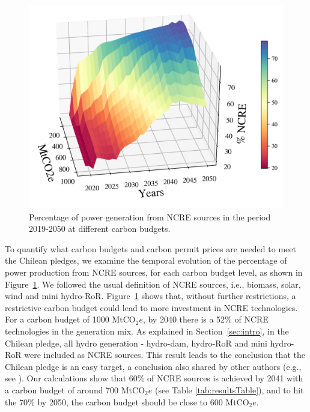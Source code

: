 \documentclass[11pt, letterpaper]{article}
\begin{document}
\smallskip

\begin{figure}[ht!]
\centering
 \includegraphics[width=4.5in]{Figures/figure4.png}
 \caption{Percentage of power generation from NCRE sources in the period 2019-2050 at different carbon budgets. }
  \label{fig:ernc_percent_cap}
  \end{figure}
  
To quantify what carbon budgets and carbon permit prices are needed to meet the Chilean pledges, we examine the temporal evolution of the percentage of power production from NCRE sources, for each carbon budget level, as shown in Figure~\ref{fig:ernc_percent_cap}. We followed the usual definition of NCRE sources, i.e., biomass, solar, wind and mini hydro-RoR. Figure~\ref{fig:ernc_percent_cap} shows that, without further restrictions, a restrictive carbon budget could lead to more investment in NCRE technologies. For a carbon budget of 1000 MtCO$_2e$, by 2040 there is a 52\% of NCRE technologies in the generation mix. As explained in Section~\ref{sec:intro}, in the Chilean pledge, all hydro generation - hydro-dam, hydro-RoR and mini hydro-RoR were included as NCRE sources. This result leads to the conclusion that the Chilean pledge is an easy target, a conclusion also shared by other authors (e.g., see \cite{munoz2017aiming}). Our calculations show that 60\% of NCRE sources is achieved by 2041 with a carbon budget of around 700 MtCO$_2e$ (see Table \ref{tab:resultsTable}), and to hit the 70\% by 2050, the carbon budget should be close to 600 MtCO$_2e$.
\end{document}
